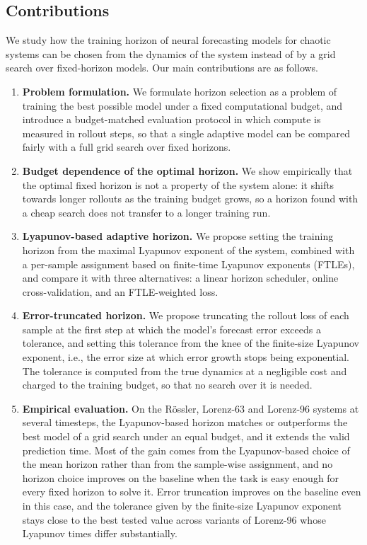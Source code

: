 \documentclass{article}
\begin{document}
\subsection{Contributions}

We study how the training horizon of neural forecasting models for chaotic systems can be chosen from the dynamics of the system instead of by a grid search over fixed-horizon models. Our main contributions are as follows.

\begin{enumerate}
    \item \textbf{Problem formulation.} We formulate horizon selection as a problem of training the best possible model under a fixed computational budget, and introduce a budget-matched evaluation protocol in which compute is measured in rollout steps, so that a single adaptive model can be compared fairly with a full grid search over fixed horizons.
    \item \textbf{Budget dependence of the optimal horizon.} We show empirically that the optimal fixed horizon is not a property of the system alone: it shifts towards longer rollouts as the training budget grows, so a horizon found with a cheap search does not transfer to a longer training run.
    \item \textbf{Lyapunov-based adaptive horizon.} We propose setting the training horizon from the maximal Lyapunov exponent of the system, combined with a per-sample assignment based on finite-time Lyapunov exponents (FTLEs), and compare it with three alternatives: a linear horizon scheduler, online cross-validation, and an FTLE-weighted loss.
    \item \textbf{Error-truncated horizon.} We propose truncating the rollout loss of each sample at the first step at which the model's forecast error exceeds a tolerance, and setting this tolerance from the knee of the finite-size Lyapunov exponent, i.e., the error size at which error growth stops being exponential. The tolerance is computed from the true dynamics at a negligible cost and charged to the training budget, so that no search over it is needed.
    \item \textbf{Empirical evaluation.} On the Rössler, Lorenz-63 and Lorenz-96 systems at several timesteps, the Lyapunov-based horizon matches or outperforms the best model of a grid search under an equal budget, and it extends the valid prediction time. Most of the gain comes from the Lyapunov-based choice of the mean horizon rather than from the sample-wise assignment, and no horizon choice improves on the baseline when the task is easy enough for every fixed horizon to solve it. Error truncation improves on the baseline even in this case, and the tolerance given by the finite-size Lyapunov exponent stays close to the best tested value across variants of Lorenz-96 whose Lyapunov times differ substantially.
\end{enumerate}
\end{document}
